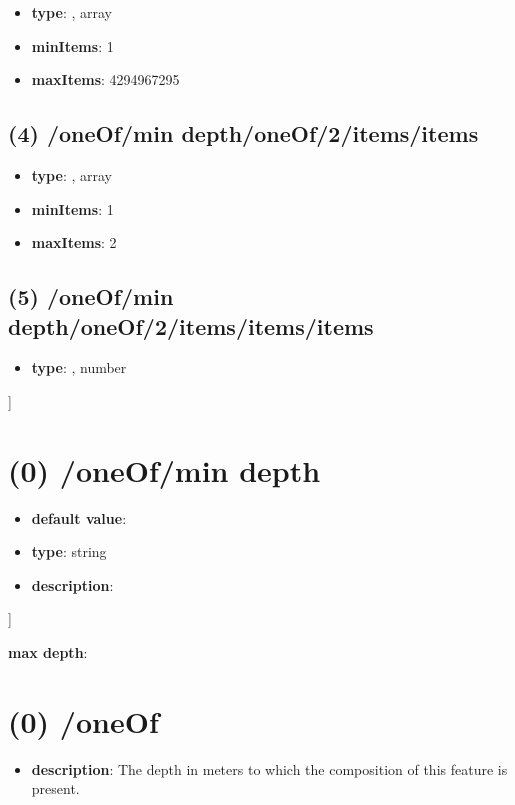 \begin{itemize}[leftmargin=3em]\item {\bf type}: , array\item {\bf minItems}: 1
\item {\bf maxItems}: 4294967295
\end{itemize}\subsection{(4) /oneOf/min depth/oneOf/2/items/items}
\begin{itemize}[leftmargin=4em]\item {\bf type}: , array\item {\bf minItems}: 1
\item {\bf maxItems}: 2
\end{itemize}\subsection{(5) /oneOf/min depth/oneOf/2/items/items/items}
\begin{itemize}[leftmargin=5em]\item {\bf type}: , number\end{itemize}]\section{(0) /oneOf/min depth}
\begin{itemize}[leftmargin=0em]\item {\bf default value}: 
\item {\bf type}: string
\item {\bf description}: 
\end{itemize}]\item {\bf max depth}: \section{(0) /oneOf}
\begin{itemize}[leftmargin=0em]\item {\bf description}: The depth in meters to which the composition of this feature is present.
\end{itemize}
